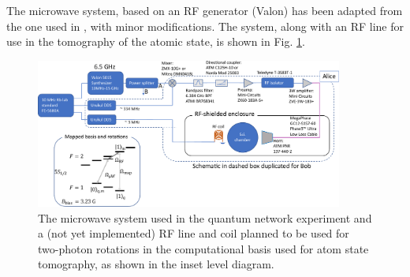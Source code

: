 The microwave system, based on an RF generator (Valon) has been adapted from the one used in \cite{Young2022thesis,kwon2019rydberg}, with minor modifications. The system, along with an RF line for use in the tomography of the atomic state, is shown in Fig. \ref{fig:microwave_system}.

\begin{figure}[!ht]
    \centering
    \includegraphics[width=0.9\textwidth]{Images/microwave_system_schematic.pdf}
    \caption{The microwave system used in the quantum network experiment and a (not yet implemented) RF line and coil planned to be used for two-photon rotations in the computational basis used for atom state tomography, as shown in the inset level diagram.}
    \label{fig:microwave_system}
\end{figure}

